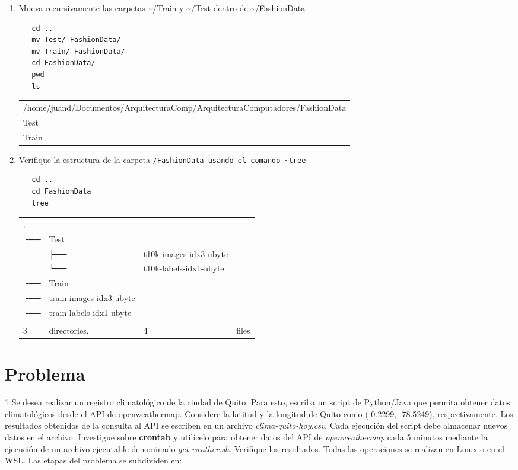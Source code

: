 \documentclass{article}
\begin{document}
\begin{enumerate}
\item Mueva recursivamente las carpetas \textasciitilde{}/Train y \textasciitilde{}/Test dentro de \textasciitilde{}/FashionData
\begin{verbatim}
   cd ..
   mv Test/ FashionData/
   mv Train/ FashionData/
   cd FashionData/
   pwd
   ls
\end{verbatim}

\begin{table}[htbp]
\label{tab:org85d011f}
\centering
\begin{tabular}{l}
/home/juand/Documentos/ArquitecturaComp/ArquitecturaComputadores/FashionData\\
Test\\
Train\\
\end{tabular}
\end{table}

\item Verifique la estructura de la carpeta \texttt{/FashionData usando el
   comando \textasciitilde{}tree}
\begin{verbatim}
   cd ..
   cd FashionData
   tree
\end{verbatim}

\begin{table}[htbp]
\label{tab:orgca4e6cf}
\centering
\begin{tabular}{llll}
. &  &  & \\
├── & Test &  & \\
│   & ├── & t10k-images-idx3-ubyte & \\
│   & └── & t10k-labels-idx1-ubyte & \\
└── & Train &  & \\
├── & train-images-idx3-ubyte &  & \\
└── & train-labels-idx1-ubyte &  & \\
 &  &  & \\
3 & directories, & 4 & files\\
\end{tabular}
\end{table}
\end{enumerate}
\section{Problema}
\label{sec:orgc7b3b1c}
1
Se desea realizar un registro climatológico de la ciudad de
Quito. Para esto, escriba un script de Python/Java que permita obtener datos climatológicos desde el API de
\href{https://openweathermap.org/current\#one}{openweathermap}. Considere la latitud y la longitud de Quito como
(-0.2299, -78.5249), respectivamente. Los resultados obtenidos de
la consulta al API se escriben en un archivo
\emph{clima-quito-hoy.csv}. Cada ejecución del script debe almacenar
nuevos datos en el archivo. Investigue sobre \textbf{crontab} y utilícelo
para obtener datos del API de \emph{openweathermap} cada 5 minutos
mediante la ejecución de un archivo ejecutable denominado
\emph{get-weather.sh}. Verifique los resultados. Todas las operaciones
se realizan en Linux o en el WSL. Las etapas del problema se
subdividen en:
\end{document}
